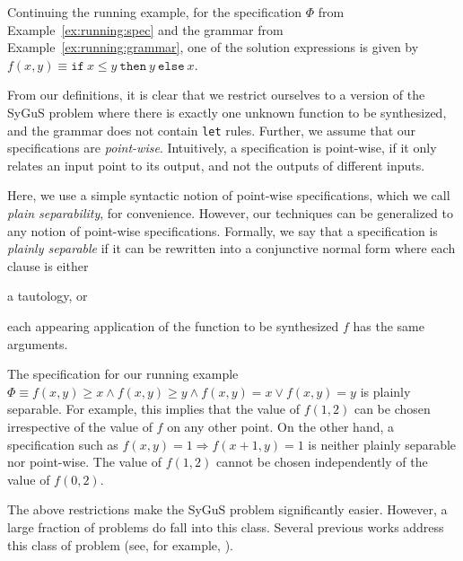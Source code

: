 \documentclass{llncs}
\newcommand\arsays[1]{{\color{red} \bf AR: #1}}
\newcommand\Spec{\Phi}
\newcommand\SynthFun{f}
\newcommand\ITE[3]{\mathtt{if}~#1~\mathtt{then}~#2~\mathtt{else}~#3}
\newcommand{\sygus}{{\sffamily\fontsize{8.5}{10}\selectfont
    SyGuS}\xspace}
\begin{document}
\begin{example}
  Continuing the running example, for the specification $\Spec$ from
  Example~\ref{ex:running:spec} and the grammar from
  Example~\ref{ex:running:grammar}, one of the solution expressions is
  given by $\SynthFun(x, y) \equiv \ITE{x \leq y}{y}{x}$.
\end{example}

From our definitions, it is clear that we restrict ourselves to a
version of the \sygus problem where there is exactly one unknown function
to be synthesized, and the grammar does not contain {\tt let} rules.
Further, we assume that our specifications are \emph{point-wise}.
Intuitively, a specification is point-wise, if it only relates an
input point to its output, and not the outputs of different inputs.

Here, we use a simple syntactic notion of point-wise specifications,
which we call \emph{plain separability}, for convenience.
However, our techniques can be generalized to any notion of point-wise
specifications.
Formally, we say that a specification is {\em plainly separable} if it
can be rewritten into a conjunctive normal form where each clause is
either
\begin{inparaenum}[(a)]
\item a tautology, or
\item each appearing application of the function to be synthesized
  $\SynthFun$ has the same arguments.
\end{inparaenum}

\begin{example}
  The specification for our running example $\Spec \equiv \SynthFun(x,
  y) \geq x \wedge \SynthFun(x, y) \geq y \wedge \SynthFun(x, y) = x
  \vee \SynthFun(x, y) = y$ is plainly separable.
  For example, this implies that the value of $\SynthFun(1, 2)$ can be
  chosen irrespective of the value of $\SynthFun$ on any other point.
  On the other hand, a specification such as $\SynthFun(x, y) = 1
  \Rightarrow \SynthFun(x + 1, y) = 1$ is neither plainly separable nor
  point-wise.
  The value of $\SynthFun(1, 2)$ cannot be chosen independently of the
  value of $\SynthFun(0, 2)$.
\end{example}

The above restrictions make the \sygus problem significantly easier.
However, a large fraction of problems do fall into this class.
Several previous works address this class of problem (see, for
example, \cite{alur-15,madhusudan-16-pw,reynolds-15}).
\end{document}
